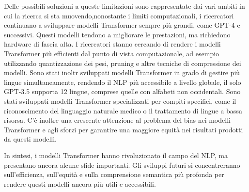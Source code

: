 Delle possibili soluzioni a queste limitazioni sono rappresentate dai vari ambiti in cui la ricerca si sta muovendo,nonostante i limiti computazionali, i ricercatori continuano a sviluppare modelli Transformer sempre più grandi, come GPT-4 e successivi. Questi modelli tendono a migliorare le prestazioni, ma richiedono hardware di fascia alta.
I ricercatori stanno cercando di rendere i modelli Transformer più efficienti dal punto di vista computazionale, ad esempio utilizzando quantizzazione dei pesi, pruning e altre tecniche di compressione dei modelli.
Sono stati inoltr sviluppati modelli Transformer in grado di gestire più lingue simultaneamente, rendendo il NLP più accessibile a livello globale, il solo GPT-3.5 supporta 12 lingue, comprese quelle con alfabeti non occidentali.
Sono stati sviluppati modelli Transformer specializzati per compiti specifici, come il riconoscimento del linguaggio naturale medico o il trattamento di lingue a bassa risorsa.
C'è inoltre una crescente attenzione al problema del bias nei modelli Transformer e agli sforzi per garantire una maggiore equità nei risultati prodotti da questi modelli.

In sintesi, i modelli Transformer hanno rivoluzionato il campo del NLP, ma presentano ancora alcune sfide importanti. Gli sviluppi futuri si concentreranno sull'efficienza, sull'equità e sulla comprensione semantica più profonda per rendere questi modelli ancora più utili e accessibili.
